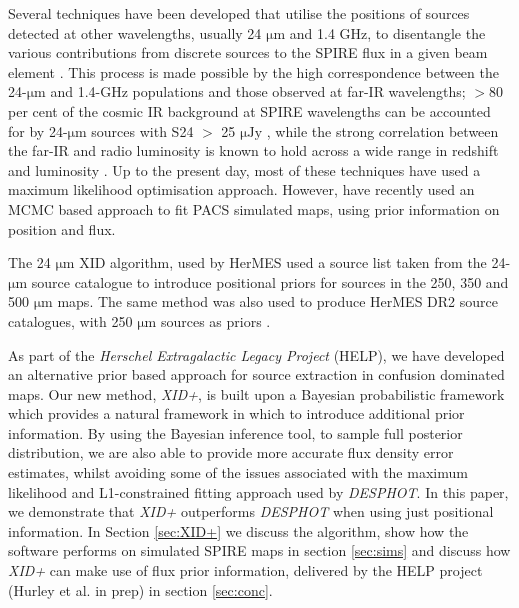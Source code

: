 \documentclass[useAMS,usenatbib]{mnras}
\begin{document}
Several techniques have been developed that utilise the positions of sources detected at other wavelengths, usually 24 $\mathrm{\mu m}$ and 1.4 GHz, to disentangle the various contributions from discrete sources to the SPIRE flux in a given beam element \citep[e.g.][]{Roseboom:2010, Roseboom:2011, Chapin:2011}. This process is made possible by the high correspondence between the 24-$\mathrm{\mu m}$ and 1.4-GHz populations and those observed at far-IR wavelengths; $>$80 per cent of the cosmic IR background at SPIRE wavelengths can be accounted for by 24-$\mathrm{\mu m}$ sources with S24 $>$ 25 $\mathrm{\mu Jy}$ \citep[e.g.]{Marsden:2009, Pascale:2009, Elbaz:2010}, while the strong correlation between the far-IR and radio luminosity is known to hold across a wide range in redshift and luminosity \citep[e.g.][]{Ivison:2010}. Up to the present day, most of these techniques have used a maximum likelihood optimisation approach. However, \cite{Safarzadeh:2015} have recently used an MCMC based approach to fit PACS simulated maps, using prior information on position and flux.
 
The 24 $\mathrm{\mu m}$ XID algorithm, used by HerMES \citep{Roseboom:2010, Roseboom:2011} used a source list taken from the 24-$\mathrm{\mu m}$ source catalogue to introduce positional priors for sources in the 250, 350 and 500 $\mathrm{\mu m}$ maps. The same method was also used to produce HerMES DR2 source catalogues, with 250 $\mathrm{\mu m}$ sources as priors \citep[DESPHOT]{Wang:2014}. 

As part of the \emph{Herschel Extragalactic Legacy Project} (HELP), we have developed an alternative prior based approach for source extraction in confusion dominated maps. Our new method, \emph{XID+}, is built upon a Bayesian probabilistic framework which provides a natural framework in which to introduce additional prior information. By using the Bayesian inference tool, \citep[\emph{Stan},][]{stan-software:2015,pystan-software:2015} to sample full posterior distribution, we are also able to provide more accurate flux density error estimates, whilst avoiding some of the issues associated with the maximum likelihood and L1-constrained fitting approach used by \emph{DESPHOT}. In this paper, we demonstrate that \emph{XID+} outperforms \emph{DESPHOT} when using just positional information. In Section \ref{sec:XID+} we discuss the algorithm, show how the software performs on simulated SPIRE maps in section \ref{sec:sims} and discuss how \emph{XID+} can make use of flux prior information, delivered by the HELP project (Hurley et al. in prep) in section \ref{sec:conc}.
 
\end{document}

